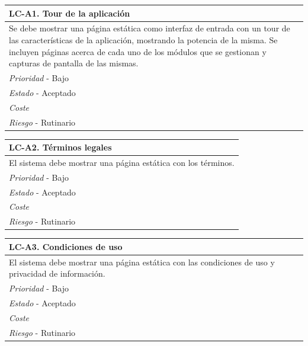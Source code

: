 	\begin{center}
		\begin{tabularx}{15cm}{|X|}
			\hline 
				\bf{LC-A1. Tour de la aplicación}\\
			\hline
				Se debe mostrar una página estática como interfaz de entrada con un tour de las características de la aplicación, mostrando la potencia de la misma. Se incluyen páginas acerca de cada uno de los módulos que se gestionan y capturas de pantalla de las mismas.\\
			\hline
				{\it Prioridad} - Bajo\\
			\hline
				{\it Estado} - Aceptado\\
			\hline
				{\it Coste}\\
			\hline
				{\it Riesgo} - Rutinario\\
			\hline
		\end{tabularx}
	\end{center}
	
	\begin{center}
		\begin{tabularx}{15cm}{|X|}
			\hline 
				\bf{LC-A2. Términos legales}\\
			\hline
				El sistema debe mostrar una página estática con los términos.\\
			\hline
				{\it Prioridad} - Bajo\\
			\hline
				{\it Estado} - Aceptado\\
			\hline
				{\it Coste}\\
			\hline
				{\it Riesgo} - Rutinario\\
			\hline
		\end{tabularx}
	\end{center}
	
	\begin{center}
		\begin{tabularx}{15cm}{|X|}
			\hline 
				\bf{LC-A3. Condiciones de uso}\\
			\hline
				El sistema debe mostrar una página estática con las condiciones de uso y privacidad de información.\\
			\hline
				{\it Prioridad} - Bajo\\
			\hline
				{\it Estado} - Aceptado\\
			\hline
				{\it Coste}\\
			\hline
				{\it Riesgo} - Rutinario\\
			\hline
		\end{tabularx}
	\end{center}
	
